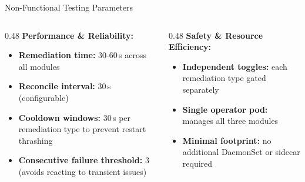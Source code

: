 \documentclass[aspectratio=169, 11pt]{beamer}
\begin{document}
\begin{frame}{Non-Functional Testing Parameters}
\footnotesize

\begin{columns}[T]
\begin{column}{0.48\textwidth}
\textbf{Performance \& Reliability:}
\begin{itemize}
  \item \textbf{Remediation time:} 30-60\,s across all modules
  \item \textbf{Reconcile interval:} 30\,s (configurable)
  \item \textbf{Cooldown windows:} 30\,s per remediation type to prevent restart thrashing
  \item \textbf{Consecutive failure threshold:} 3 (avoids reacting to transient issues)
\end{itemize}
\end{column}

\begin{column}{0.48\textwidth}
\textbf{Safety \& Resource Efficiency:}
\begin{itemize}
  \item \textbf{Independent toggles:} each remediation type gated separately
  \item \textbf{Single operator pod:} manages all three modules
  \item \textbf{Minimal footprint:} no additional DaemonSet or sidecar required
\end{itemize}
\end{column}
\end{columns}

\end{frame}
\end{document}
